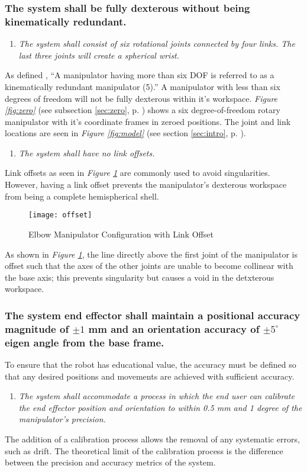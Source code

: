 \subsubsection{The system shall be fully dexterous without being kinematically redundant.}
\begin{enumerate}
\item \textit{The system shall consist of six rotational joints connected by four links. The last three joints will create a spherical wrist.}
\end{enumerate}
As defined \cite{robo}, “A manipulator having more than six DOF is referred to as a kinematically redundant manipulator (5).” A manipulator with less than six degrees of freedom will not be fully dexterous within it's workspace. \emph{Figure \ref{fig:zero}} (see subsection \ref{sec:zero}, p. \pageref{fig:zero}) shows a six degree-of-freedom rotary manipulator with it's coordinate frames in zeroed positions. The joint and link locations are seen in \emph{Figure \ref{fig:model}} (see section \ref{sec:intro}, p. \pageref{sec:intro}).
\begin{enumerate}[resume]
\item \textit{The system shall have no link offsets.}
\end{enumerate}%
Link offsets as seen in \emph{Figure \ref{fig:offset}} are commonly used to avoid singularities. However, having a link offset prevents the manipulator's dexterous workspace from being a complete hemispherical shell.

\begin{figure}[htp]
  \centering
  \texttt{[image: offset]}
  \caption[Elbow Manipulator Configuration with Link Offset]{Elbow Manipulator Configuration with Link Offset \cite{robo}}
  \label{fig:offset}
\end{figure}
As shown in \emph{Figure \ref{fig:offset}}, the line directly above the first joint of the manipulator is offset such that the axes of the other joints are unable to become collinear with the base axis; this prevents singularity but causes a void in the detxterous workspace.
\subsubsection{The system end effector shall maintain a positional accuracy magnitude of \(\pm 1\) mm and an orientation accuracy of \(\pm 5^{\circ}\) eigen angle from the base frame.}
To ensure that the robot has educational value, the accuracy must be defined so that any desired positions and movements are achieved with sufficient accuracy.
\begin{enumerate}
  \item \textit{The system shall accommodate a process in which the end user can calibrate the end effector position and orientation to within 0.5 mm and 1 degree of the manipulator’s precision.}
\end{enumerate}
The addition of a calibration process allows the removal of any systematic errors, such as drift. The theoretical limit of the calibration process is the difference between the precision and accuracy metrics of the system.
